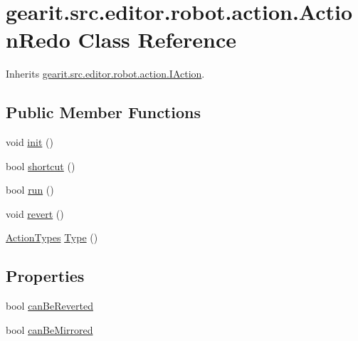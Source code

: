 \hypertarget{classgearit_1_1src_1_1editor_1_1robot_1_1action_1_1_action_redo}{\section{gearit.\+src.\+editor.\+robot.\+action.\+Action\+Redo Class Reference}
\label{classgearit_1_1src_1_1editor_1_1robot_1_1action_1_1_action_redo}
}


Inherits \hyperlink{interfacegearit_1_1src_1_1editor_1_1robot_1_1action_1_1_i_action}{gearit.\+src.\+editor.\+robot.\+action.\+I\+Action}.

\subsection*{Public Member Functions}
\begin{DoxyCompactItemize}
\item 
void \hyperlink{classgearit_1_1src_1_1editor_1_1robot_1_1action_1_1_action_redo_a0d35fb2259a15eb22478f23ee188d7ec}{init} ()
\item 
bool \hyperlink{classgearit_1_1src_1_1editor_1_1robot_1_1action_1_1_action_redo_abae39fe9614d18ebda577f1db3889261}{shortcut} ()
\item 
bool \hyperlink{classgearit_1_1src_1_1editor_1_1robot_1_1action_1_1_action_redo_aef3ae3d9602a89c58a777a167e8928f2}{run} ()
\item 
void \hyperlink{classgearit_1_1src_1_1editor_1_1robot_1_1action_1_1_action_redo_af95c6fbb28cf520d79bb4461f965f82c}{revert} ()
\item 
\hyperlink{namespacegearit_1_1src_1_1editor_1_1robot_1_1action_a4be0fd46e3952d6135136b20e7b3fc5e}{Action\+Types} \hyperlink{classgearit_1_1src_1_1editor_1_1robot_1_1action_1_1_action_redo_ae40ee4496600c5ac95ac3ae554756713}{Type} ()
\end{DoxyCompactItemize}
\subsection*{Properties}
\begin{DoxyCompactItemize}
\item 
bool \hyperlink{classgearit_1_1src_1_1editor_1_1robot_1_1action_1_1_action_redo_ab001dda2883ca12b60dfac14e0bcb607}{can\+Be\+Reverted}
\item 
bool \hyperlink{classgearit_1_1src_1_1editor_1_1robot_1_1action_1_1_action_redo_ab5222aae86c8fc358a8f338e96ef13ec}{can\+Be\+Mirrored}
\end{DoxyCompactItemize}



